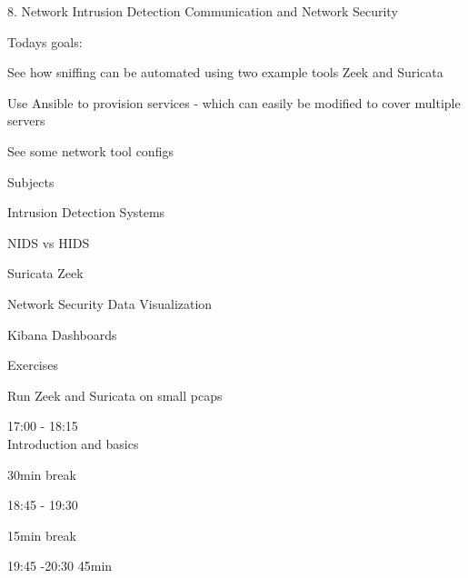 \documentclass[Screen16to9,17pt]{foils}
\begin{document}
\mytitlepage
{8. Network Intrusion Detection}
{Communication and Network Security \the\year}



Todays goals:
\begin{list2}
\item See how sniffing can be automated using two example tools Zeek and Suricata
\item Use Ansible to provision services - which can easily be modified to cover multiple servers
\item See some network tool configs
\end{list2}




\begin{list1}
\item Subjects
\begin{list2}
\item Intrusion Detection Systems
\item NIDS vs HIDS
\item Suricata Zeek
\item Network Security Data Visualization
\item Kibana Dashboards
\end{list2}
\item Exercises
\begin{list2}
\item Run Zeek and Suricata on small pcaps
\end{list2}
\end{list1}


\begin{list2}
\item 17:00 - 18:15\\
Introduction and basics
\item 30min break\\

\item 18:45 - 19:30\\

\item 15min break\\

\item 19:45 -20:30 45min\\
\end{list2}
\end{document}
